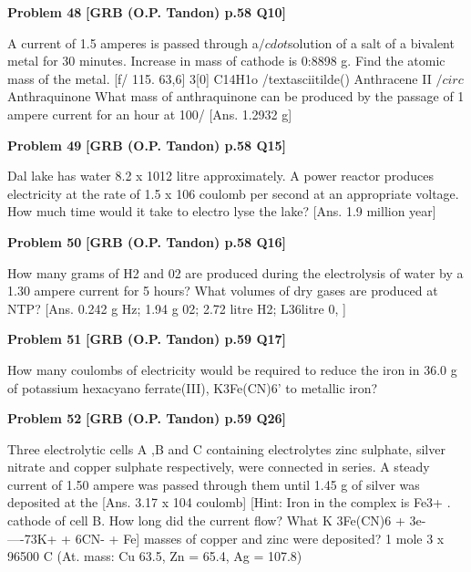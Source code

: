 \begin{problembox}
\textbf{Problem 48} \hfill \textbf{[GRB (O.P. Tandon) p.58 Q10]}
\label{q:ext-grb_all_questions-48}

A current of 1.5 amperes is passed through a$/cdot$solution of a salt 
of a bivalent metal for 30 minutes. Increase in mass of cathode 
is 0:8898 g. Find the atomic mass of the metal. 
[f/ 115. 
63,6] 
3[0] 
C14H1o /textasciitilde() 
Anthracene 
II $/circ$ 
Anthraquinone 
What mass of anthraquinone can be produced by the passage 
of 1 ampere current for an hour at 100/%
[Ans. 
1.2932 g]
\end{problembox}

\begin{problembox}
\textbf{Problem 49} \hfill \textbf{[GRB (O.P. Tandon) p.58 Q15]}
\label{q:ext-grb_all_questions-49}

Dal lake has water 8.2 x 1012 litre approximately. A power 
reactor produces electricity at the rate of 1.5 x 106 coulomb 
per second at an appropriate voltage. How much time would it 
take to electro lyse the lake? 
[Ans. 
1.9 million year]
\end{problembox}

\begin{problembox}
\textbf{Problem 50} \hfill \textbf{[GRB (O.P. Tandon) p.58 Q16]}
\label{q:ext-grb_all_questions-50}

How many grams of H2 and 02 are produced during the 
electrolysis of water by a 1.30 ampere current for 5 hours? 
What volumes of dry gases are produced at NTP? 
[Ans. 
0.242 g Hz; 1.94 g 02; 2.72 litre H2; L36litre 0, ]
\end{problembox}

\begin{problembox}
\textbf{Problem 51} \hfill \textbf{[GRB (O.P. Tandon) p.59 Q17]}
\label{q:ext-grb_all_questions-51}

How many coulombs of electricity would be required to 
reduce the iron in 36.0 g of potassium hexacyano ferrate(III), 
K3Fe(CN)6' to metallic iron?
\end{problembox}

\begin{problembox}
\textbf{Problem 52} \hfill \textbf{[GRB (O.P. Tandon) p.59 Q26]}
\label{q:ext-grb_all_questions-52}

Three electrolytic cells A ,B and C containing electrolytes zinc 
sulphate, silver nitrate and copper sulphate respectively, were 
connected in series. A steady current of 1.50 ampere was 
passed through them until 1.45 g of silver was deposited at the 
[Ans. 
3.17 x 104 coulomb] 
[Hint: Iron in the complex is Fe3+ . 
cathode of cell B. How long did the current flow? What 
K
3Fe(CN)6 + 
3e-
----73K+ + 6CN- + Fe] 
masses of copper and zinc were deposited? 
1 mole 
3 x 96500 C 
(At. mass: 
Cu 
63.5, Zn = 65.4, Ag = 107.8)
\end{problembox}

